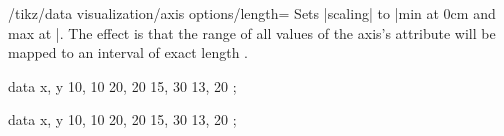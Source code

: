 \begin{key}{/tikz/data visualization/axis options/length=}
    Sets |scaling| to |min at 0cm and max at |. The effect is
    that the range of all values of the axis's attribute will be mapped to an
    interval of exact length .
\begin{codeexample}[preamble={\usetikzlibrary{datavisualization}}]
\tikz \datavisualization [scientific axes,
                          x axis={length=3cm},
                          y axis={length=2cm},
                          all axes={ticks=few},
                          visualize as line]
    data {
      x, y
      10, 10
      20, 20
      15, 30
      13, 20
    };
\end{codeexample}
\begin{codeexample}[preamble={\usetikzlibrary{datavisualization}}]
\tikz \datavisualization [scientific axes,
                          x axis={length=3cm},
                          y axis={length=4cm},
                          all axes={ticks=few},
                          visualize as line]
    data {
      x, y
      10, 10
      20, 20
      15, 30
      13, 20
    };
\end{codeexample}
\end{key}

